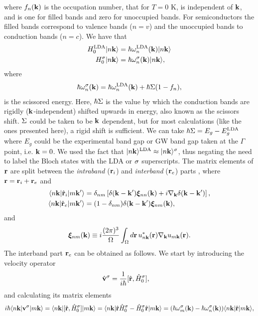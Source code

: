 \documentclass[floatfix,prb,aps,superscriptaddress,11pt,preprint,letterpaper]{revtex4}
\begin{document}
where $f_n(\mathbf{k})$ is the occupation number, that for $T=0$ K, is
independent of $\mathbf{k}$, and is one for filled bands and zero for
unoccupied bands. For semiconductors the filled bands correspond to
valence
bands  ($n=v$) and the unoccupied bands to conduction bands
 ($n=c$). 
We have that
\begin{align}\label{chon.1}  
H^{\mathrm{LDA}}_0| n\mathbf{k} \rangle&=\hbar\omega^{\mathrm{LDA}}_n(\mathbf{k})| n\mathbf{k} \rangle
\nonumber\\
H^\sigma_0| n\mathbf{k} \rangle&=\hbar\omega^\sigma_n(\mathbf{k})| n\mathbf{k} \rangle
,
\end{align} 
where 
\begin{align}\label{chon.78}
\hbar\omega^\sigma_n(\mathbf{k})=\hbar\omega^{\mathrm{LDA}}_n(\mathbf{k})+\hbar\Sigma(1-f_n)
,
\end{align}
is the
 scissored
energy. Here, 
$\hbar\Sigma$ is the value by which the conduction bands are rigidly
($\mathbf{k}$-independent)
 shifted
upwards in energy, also known as the scissors shift. $\Sigma$ could be taken to be
$\mathbf{k}$ dependent, but for most calculations (like the ones presented
here), a rigid shift is sufficient. We can take 
$\hbar\Sigma=E_g-E_g^{\mathrm{LDA}}$ where $E_g$ could be the experimental band gap 
or GW band gap taken at the $\Gamma$ point, i.e. $\mathbf{k}=0$.
We used the fact that 
$| n\mathbf{k} \rangle^{\mathrm{LDA}}\approx| n\mathbf{k} \rangle^\sigma$, thus negating the need to label
the Bloch states with the LDA or $\sigma$ superscripts. 
The matrix elements of $\mathbf{r}$ are split between the {\it intraband} 
($\mathbf{r}_i$) and {\it interband} ($\mathbf{r}_e$) parts , where 
$\mathbf{r}=\mathbf{r}_i+\mathbf{r}_e$ and\cite{adamsJCP53,blountSSP62,aversaPRB95}
\begin{align}\label{rnminn}
\langle n\mathbf{k} |\hat{\mathbf{r}}_i| m\mathbf{k}' \rangle &= \delta_{nm}\left[\delta(\mathbf{k}-\mathbf{k}')\boldsymbol{\xi}_{nn}(\mathbf{k})
+i\nabla_{\mathbf{k}}\delta(\mathbf{k}-\mathbf{k}')\right], \\
\langle n\mathbf{k} |\hat{\mathbf{r}}_e| m\mathbf{k}' \rangle &=
(1-\delta_{nm})\delta(\mathbf{k}-\mathbf{k}')\boldsymbol{\xi}_{nm}(\mathbf{k})
,
\label{rnmenn}
\end{align}
and
\begin{equation}\label{zetann}
\boldsymbol{\xi}_{nm}(\mathbf{k}) \equiv i\frac{(2\pi)^3}{\Omega}\int_{\Omega} d\mathbf{r}\, u^*_{n\mathbf{k}}(\mathbf{r})\nabla_{\mathbf{k}}u_{m\mathbf{k}}(\mathbf{r}).
\end{equation}
The interband part $\mathbf{r}_e$ can
be obtained as follows. 
We start by introducing the 
velocity operator
\begin{align}\label{vop}
\hat{\mathbf{v}}^\sigma&=
\frac{1}{i\hbar}[\hat{\mathbf{r}},\hat{H}^\sigma_0]
,
\end{align}
and calculating its matrix elements
\begin{equation}\label{conhrnm}
i\hbar\langle n\mathbf{k} |
\mathbf{v}^\sigma
| m\mathbf{k} \rangle
=
\langle n\mathbf{k} |
[\hat{\mathbf{r}},\hat{H}^\sigma_0]
| m\mathbf{k} \rangle
=\langle n\mathbf{k} |\hat{\mathbf{r}}\hat{H}^\sigma_0-\hat{H}^\sigma_0\hat{\mathbf{r}}| m\mathbf{k} \rangle
=(\hbar\omega^\sigma_m(\mathbf{k})-\hbar\omega^\sigma_n(\mathbf{k}))\langle n\mathbf{k} |\hat{\mathbf{r}}| m\mathbf{k} \rangle
,
\end{equation}
\end{document}
